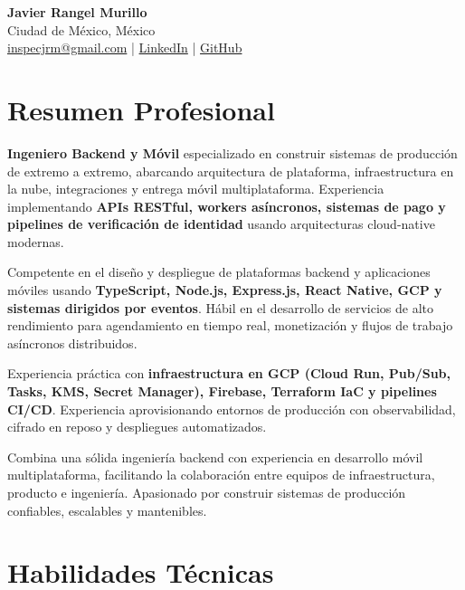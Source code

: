 \documentclass[10pt, letterpaper]{article}
\begin{document}
\pagestyle{empty}

\begin{center}
  {\LARGE\bfseries Javier Rangel Murillo}\\[3pt]
  Ciudad de M\'{e}xico, M\'{e}xico\\[1pt]
  \href{mailto:inspecjrm@gmail.com}{inspecjrm@gmail.com} \enspace|\enspace
  \href{https://linkedin.com/in/javierramu2004}{LinkedIn} \enspace|\enspace
  \href{https://github.com/JavierRangel2004}{GitHub}
\end{center}

\section{Resumen Profesional}

\textbf{Ingeniero Backend y M\'{o}vil} especializado en construir sistemas de
producci\'{o}n de extremo a extremo, abarcando arquitectura de plataforma,
infraestructura en la nube, integraciones y entrega m\'{o}vil multiplataforma.
Experiencia implementando \textbf{APIs RESTful, workers as\'{i}ncronos, sistemas
de pago y pipelines de verificaci\'{o}n de identidad} usando arquitecturas
cloud-native modernas.

Competente en el dise\~{n}o y despliegue de plataformas backend y aplicaciones
m\'{o}viles usando \textbf{TypeScript, Node.js, Express.js, React Native, GCP y
sistemas dirigidos por eventos}. H\'{a}bil en el desarrollo de servicios de alto
rendimiento para agendamiento en tiempo real, monetizaci\'{o}n y flujos de
trabajo as\'{i}ncronos distribuidos.

Experiencia pr\'{a}ctica con \textbf{infraestructura en GCP (Cloud Run, Pub/Sub,
Tasks, KMS, Secret Manager), Firebase, Terraform IaC y pipelines CI/CD}.
Experiencia aprovisionando entornos de producci\'{o}n con observabilidad,
cifrado en reposo y despliegues automatizados.

Combina una s\'{o}lida ingenier\'{i}a backend con experiencia en desarrollo
m\'{o}vil multiplataforma, facilitando la colaboraci\'{o}n entre equipos de
infraestructura, producto e ingenier\'{i}a. Apasionado por construir sistemas
de producci\'{o}n confiables, escalables y mantenibles.

\section{Habilidades T\'{e}cnicas}
\end{document}
